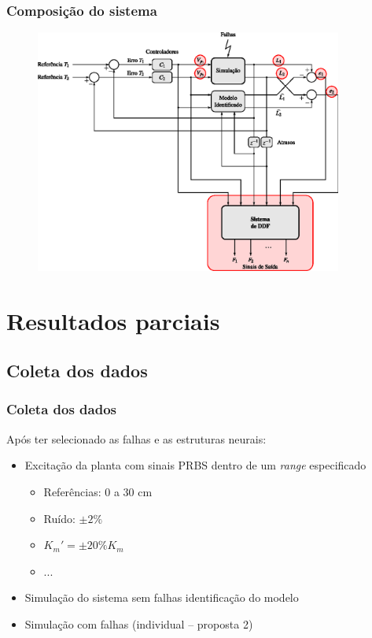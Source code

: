 \documentclass{beamer}
\begin{document}
\begin{frame}
    \frametitle{Composição do sistema}

\begin{figure}[htb]
\centering
    \includegraphics[width=0.9\textwidth]{imgs/sistema/eps/composicao_mod_8}
\end{figure}
\end{frame}

\section{Resultados parciais}
\subsection{Coleta dos dados}

\begin{frame}
    \frametitle{Coleta dos dados}

    Após ter selecionado as falhas e as estruturas neurais:

\begin{itemize}
    \item Excitação da planta com sinais PRBS dentro de um {\it range}
          especificado
    \begin{itemize}
        \item Referências: 0 a 30 cm
        \item Ruído: $\pm 2\%$
        \item $K_m' = \pm 20\% K_m$
        \item ...
    \end{itemize}
    \item Simulação do sistema sem falhas \implica identificação do modelo
    \item Simulação com falhas (individual -- proposta 2)
\end{itemize}
\end{frame}
\end{document}
